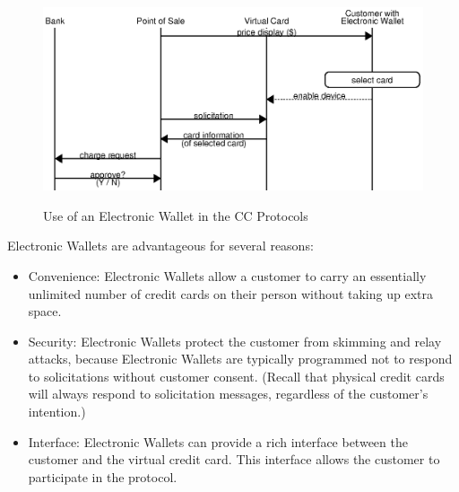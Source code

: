 \begin{figure}[h!]
  \caption{Use of an Electronic Wallet in the CC Protocols}
  \centering
    \includegraphics{img/wallet.eps}
  \label{fig:wallet}
\end{figure}

\pagebreak
Electronic Wallets are advantageous for several reasons:
\begin{itemize}
\item Convenience: Electronic Wallets allow a customer to carry an essentially unlimited number of credit cards on their person without taking up extra space.
\item Security: Electronic Wallets protect the customer from skimming and relay attacks,
    because Electronic Wallets are typically programmed not to respond to solicitations without customer consent.
    (Recall that physical credit cards will always respond to solicitation messages, regardless of the customer's intention.)
\item Interface: Electronic Wallets can provide a rich interface between the customer and the virtual credit card.
    This interface allows the customer to participate in the protocol.
\end{itemize}

